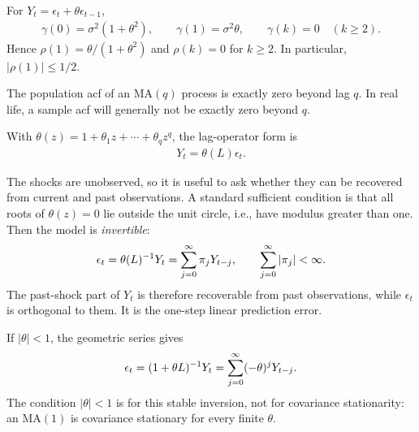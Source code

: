 \documentclass[a4paper,12pt]{article}
\begin{document}
\begin{example}[$\mathrm{MA}(1)$]\label{ex-ma1}
	For $Y_t=\epsilon_t+\theta\epsilon_{t-1}$,
	\begin{align}
		\gamma(0)=\sigma^2(1+\theta^2),\qquad
		\gamma(1)=\sigma^2\theta,\qquad
		\gamma(k)=0\quad(k\ge2).
	\end{align}
	Hence $\rho(1)=\theta/(1+\theta^2)$ and $\rho(k)=0$ for $k\ge2$.
	In particular, $|\rho(1)|\le1/2$.
\end{example}

\begin{remark}
	The population \gls{acf} of an $\mathrm{MA}(q)$ process is exactly zero beyond lag $q$.
	In real life, a sample \gls{acf} will generally not be exactly zero beyond $q$.
\end{remark}

\begin{remark}
	With $\theta(z)=1+\theta_1z+\cdots+\theta_qz^q$, the lag-operator form is
	\begin{align}
		Y_t=\theta(L)\epsilon_t.
	\end{align}
\end{remark}

\begin{remark}
	The shocks are unobserved, so it is useful to ask whether they can be recovered from current and past observations.
	A standard sufficient condition is that all roots of $\theta(z)=0$ lie outside the unit circle,
	i.e., have modulus greater than one.
	Then the model is \emph{invertible}:
	\begin{align}
		\epsilon_t=\theta(L)^{-1} Y_t
		=\sum_{j=0}^{\infty}\pi_jY_{t-j},\qquad
		\sum_{j=0}^{\infty}|\pi_j|<\infty.
	\end{align}
	The past-shock part of $Y_t$ is therefore recoverable from past observations,
	while $\epsilon_t$ is orthogonal to them. It is the one-step linear prediction error.
\end{remark}

\begin{example}
	If $|\theta|<1$, the geometric series gives
	\begin{align}
		\epsilon_t=(1+\theta L)^{-1} Y_t
		=\sum_{j=0}^{\infty}(-\theta)^jY_{t-j}.
	\end{align}
	The condition $|\theta|<1$ is for this stable inversion, not for covariance stationarity:
	an $\mathrm{MA}(1)$ is covariance stationary for every finite $\theta$.
\end{example}
\end{document}
